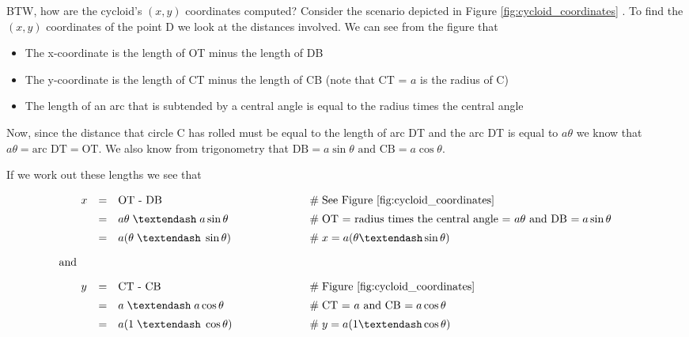 \documentclass{article}
\theoremstyle{definition}
\begin{document}
\bigskip
\noindent
BTW, how are the cycloid's $(x,y)$ coordinates computed? Consider
the scenario depicted in Figure \ref{fig:cycloid_coordinates}
\cite{cycloid_coordinates}. To find the $(x,y)$ coordinates of
the point D we look at the distances involved. We can see from
the figure that  

\medskip
\begin{itemize}
 \item The x-coordinate is the length of OT minus the length of DB
 \item The y-coordinate is the length of CT minus the length of CB 
 (note that CT = $a$ is the radius of C)
 \item The length of an arc that is subtended by a central angle is 
       equal to the radius times the central angle
\end{itemize} 

\bigskip
\noindent
Now, since the distance that circle C has rolled must be equal to
the length of arc DT and the arc DT is equal to $a \theta$ we know
that $a\theta = \text{arc DT} = \text{OT}$. We also know from
trigonometry that $\text{DB} = a \sin \theta \text{ and } \text{CB}
= a \cos \theta$.  

\bigskip
\noindent
If we work out these lengths we see that

\begin{equation*}
\begin{array}{lllll}
x
&=& \text{OT - DB}   					&\qquad \qquad \qquad \mathrel{\#} \text{See Figure \ref{fig:cycloid_coordinates}} \\
[5pt]
&=& a\theta \; – \; a \sin \theta       &\qquad \qquad \qquad \mathrel{\#} \text{OT = radius times the central angle = $a \theta$ and DB $= a \sin \theta$} \\
[5pt]
&=& a (\theta \; – \; \sin \theta)      &\qquad \qquad \qquad \mathrel{\#} x = a (\theta – \sin \theta) \\
[10pt]
\hspace{-2em} \text{and} \\
[10pt]
y
&=& \text{CT - CB}                      &\qquad \qquad \qquad \mathrel{\#} \text{Figure \ref{fig:cycloid_coordinates}} \\
[5pt]
&=& a \; – \; a \cos \theta             &\qquad \qquad \qquad \mathrel{\#} \text{CT = $a$ and CB $= a \cos \theta$} \\
[5pt]
&=& a (1 \; – \; \cos \theta)           &\qquad \qquad \qquad \mathrel{\#} y = a (1 – \cos \theta) 
\end{array}
\end{equation*}
\end{document}
